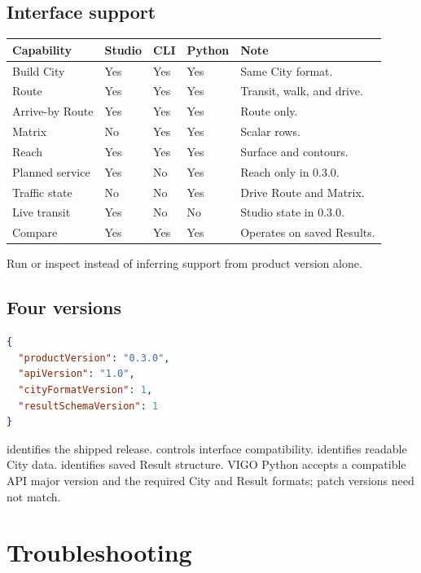 \documentclass[10pt,letterpaper]{article}
\begin{document}
\subsection{Interface support}

\begin{center}
\begin{tabularx}{\linewidth}{P{1.55in} Z Z Z Y}
\toprule
\textbf{Capability} & \textbf{Studio} & \textbf{CLI} & \textbf{Python} & \textbf{Note} \\
\midrule
Build City & Yes & Yes & Yes & Same City format. \\
Route & Yes & Yes & Yes & Transit, walk, and drive. \\
Arrive-by Route & Yes & Yes & Yes & Route only. \\
Matrix & No & Yes & Yes & Scalar rows. \\
Reach & Yes & Yes & Yes & Surface and contours. \\
Planned service & Yes & No & Yes & Reach only in 0.3.0. \\
Traffic state & No & No & Yes & Drive Route and Matrix. \\
Live transit & Yes & No & No & Studio state in 0.3.0. \\
Compare & Yes & Yes & Yes & Operates on saved Results. \\
\bottomrule
\end{tabularx}
\end{center}

Run  or inspect  instead of inferring support from product version alone.

\subsection{Four versions}

\begin{lstlisting}[language=json]
{
  "productVersion": "0.3.0",
  "apiVersion": "1.0",
  "cityFormatVersion": 1,
  "resultSchemaVersion": 1
}
\end{lstlisting}

 identifies the shipped release.  controls interface compatibility.  identifies readable City data.  identifies saved Result structure. VIGO Python accepts a compatible API major version and the required City and Result formats; patch versions need not match.

\section{Troubleshooting}
\end{document}
